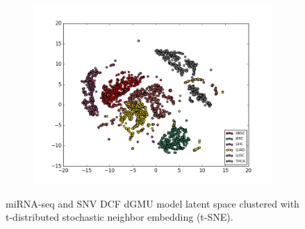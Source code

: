 \begin{figure}[H]
     \centering
     \begin{subfigure}[b]{\textwidth}
         \centering
         \includegraphics[width=\textwidth]{img/m_s/m_s_dcf_tsne.png}
     \end{subfigure}
        \caption{miRNA-seq and SNV DCF dGMU model latent space clustered with t-distributed stochastic neighbor embedding (t-SNE).}
        \label{fig:m_s_dcf_tsne}
\end{figure}